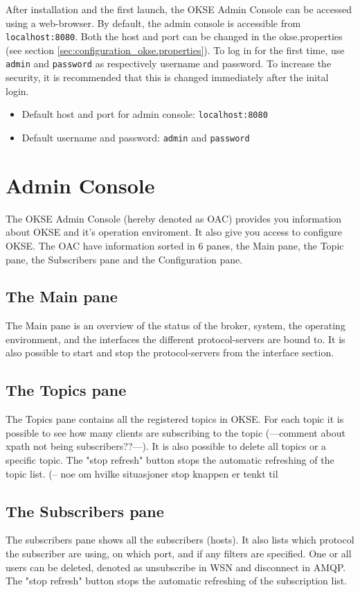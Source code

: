After installation and the first launch, the OKSE Admin Console can be accessed using a web-browser. By default, the admin console is accessible from \verb!localhost:8080!. Both the host and port can be changed in the okse.properties (see section \ref{sec:configuration_okse.properties}). To log in for the first time, use \verb!admin! and \verb!password! as respectively username and password. To increase the security, it is recommended that this is changed immediately after the inital login. 

\begin{itemize}
\setlength{\itemsep}{0cm}%
\item Default host and port for admin console: \verb!localhost:8080!
\item Default username and password: \verb!admin! and \verb!password!
\end{itemize}

\section{Admin Console}
The OKSE Admin Console (hereby denoted as OAC) provides you information about OKSE and it's operation enviroment. It also give you access to configure OKSE. The OAC have information sorted in 6 panes, the Main pane, the Topic pane, the Subscribers pane and the Configuration pane.

\subsection{The Main pane}
The Main pane is an overview of the status of the broker, system, the operating environment, and the interfaces the different protocol-servers are bound to. It is also possible to start and stop the protocol-servers from the interface section.

\subsection{The Topics pane}
The Topics pane contains all the registered topics in OKSE. For each topic it is possible to see how many clients are subscribing to the topic (---comment about xpath not being subscribers??---). It is also possible to delete all topics or a specific topic. The "stop refresh" button stops the automatic refreshing of the topic list. (-- noe om hvilke situasjoner stop knappen er tenkt til

\subsection{The Subscribers pane}
The subscribers pane shows all the subscribers (hosts). It also lists which protocol the subscriber are using, on which port, and if any filters are specified. One or all users can be deleted, denoted as unsubscribe in WSN and disconnect in AMQP. The "stop refresh" button stops the automatic refreshing of the subscription list.

